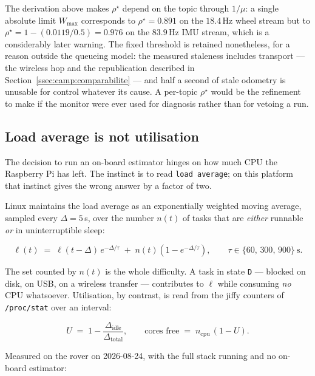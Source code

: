The derivation above makes $\rho^\star$ depend on the topic through
$1/\mu$: a single absolute limit $W_{\max}$ corresponds to
$\rho^\star = 0.891$ on the $18.4$\,Hz wheel stream but to
$\rho^\star = 1 - (0.0119/0.5) = 0.976$ on the $83.9$\,Hz IMU stream, which is
a considerably later warning. The fixed threshold is retained nonetheless, for
a reason outside the queueing model: the measured staleness includes transport
--- the wireless hop and the republication described in
Section~\ref{ssec:camp:comparabilite} --- and half a second of stale odometry
is unusable for control whatever its cause. A per-topic $\rho^\star$ would be
the refinement to make if the monitor were ever used for diagnosis rather than
for vetoing a run.

\subsection{Load average is not utilisation}
\label{ssec:camp:charge}

The decision to run an on-board estimator hinges on how much CPU the Raspberry
Pi has left. The instinct is to read \texttt{load average}; on this platform
that instinct gives the wrong answer by a factor of two.

Linux maintains the load average as an exponentially weighted moving average,
sampled every $\Delta = 5$\,s, over the number $n(t)$ of tasks that are
\emph{either} runnable \emph{or} in uninterruptible sleep:

\begin{equation}
  \ell(t) \;=\; \ell(t-\Delta)\,e^{-\Delta/\tau}
             \;+\; n(t)\left(1 - e^{-\Delta/\tau}\right),
  \qquad \tau \in \{60,\,300,\,900\}\ \text{s}.
  \label{eq:camp:ewma}
\end{equation}

The set counted by $n(t)$ is the whole difficulty. A task in state
\texttt{D} --- blocked on disk, on USB, on a wireless transfer --- contributes
to $\ell$ while consuming \emph{no} CPU whatsoever. Utilisation, by contrast,
is read from the jiffy counters of \texttt{/proc/stat} over an interval:

\begin{equation}
  U \;=\; 1 - \frac{\Delta_{\text{idle}}}{\Delta_{\text{total}}},
  \qquad
  \text{cores free} \;=\; n_{\mathrm{cpu}}\,(1-U).
  \label{eq:camp:util}
\end{equation}

Measured on the rover on 2026-08-24, with the full stack running and no
on-board estimator:

